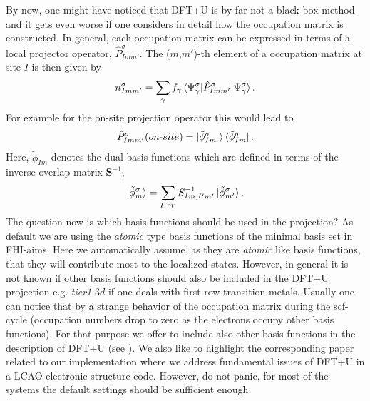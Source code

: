 By now, one might have noticed that DFT+U is by far not a black box method and it gets even worse if one considers in detail how the occupation matrix is constructed. In general, each occupation matrix can be expressed in terms of a local projector operator, $\hat{P}^{\sigma}_{Imm'}$. The ($m$,$m'$)-th element of a occupation matrix at site $I$ is then given by
   \begin{align}
   \label{general_occ_mat}
      n^{\sigma}_{Imm'} = \sum _{\gamma} f_{\gamma} \braket{\Psi _{\gamma}^{\sigma} |\hat{P}^{\sigma}_{Imm'}|\Psi _{\gamma}^{\sigma}}.
   \end{align}
For example for the on-site projection operator this would lead to
\begin{align}
\hat{P}^{\sigma}_{Imm'}(on\text{-}site) = \ket{\tilde{\phi}^{\sigma} _{Im'}}\bra{\tilde{\phi}^{\sigma} _{Im}}.
\end{align}
Here, $\tilde{\phi}_{Im}$ denotes the dual basis functions which are defined in terms of the inverse overlap matrix $\mathbf{S}^{-1}$,
   \begin{align}
      \ket{\tilde{\phi}^{\sigma} _{m}} = \sum _{I'm'} S^{-1}_{Im,I'm'} \ket{\tilde{\phi}^{\sigma} _{m'}}.
  \end{align}
The question now is which basis functions should be used in the projection? As default we are using the \textit{atomic} type basis functions of the minimal basis set in FHI-aims. Here we automatically assume, as they are \textit{atomic} like basis functions, that they will contribute most to the localized states. However, in general it is not known if other basis functions should also be included in the DFT+U projection e.g. \textit{tier1} $3d$ if one deals with first row transition metals. Usually one can notice that by a strange behavior of the occupation matrix during the scf-cycle (occupation numbers drop to zero as the electrons occupy other basis functions). For that purpose we offer to include also other basis functions in the description of DFT+U (see ). We also like to highlight the corresponding paper related to our implementation where we address fundamental issues of DFT+U in a LCAO electronic structure code. However, do not panic, for most of the systems the default settings should be sufficient enough.

